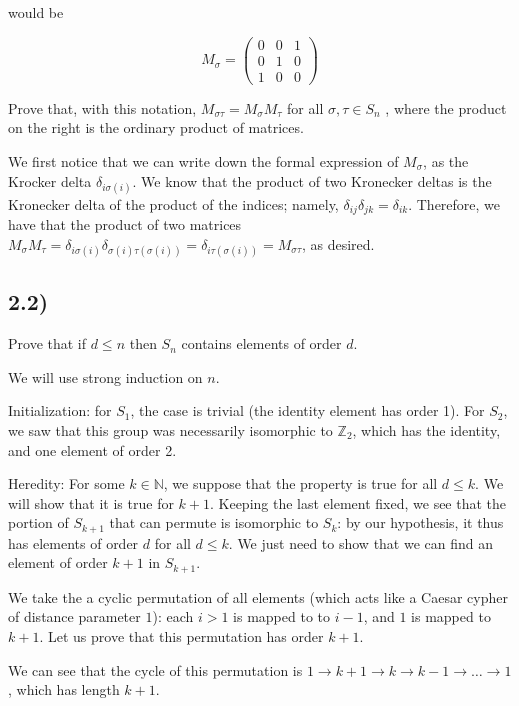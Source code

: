\documentclass[12pt, letterpaper, twoside]{report}
\begin{document}
would be

\begin{equation}
M_\sigma =
	\begin{pmatrix}
		0 & 0 & 1 \\
		0 & 1 & 0 \\
		1 & 0 & 0
	\end{pmatrix}
\end{equation}

Prove that, with this notation, $M_{\sigma\tau} = M_\sigma M_\tau$ for all $\sigma, \tau \in S_n$ , where the product on the right is the ordinary product of matrices.

We first notice that we can write down the formal expression of $M_\sigma$, as the Krocker delta $\delta_{i \sigma(i)}$. We know that the product of two Kronecker deltas is the Kronecker delta of the product of the indices; namely, $\delta_{ij} \delta_{jk} = \delta_{ik}$. Therefore, we have that the product of two matrices $M_\sigma M_\tau = \delta_{i \sigma(i)} \delta_{\sigma(i) \tau(\sigma(i))} = \delta_{i \tau(\sigma(i))} = M_{\sigma\tau}$, as desired.


\subsection*{2.2)}

Prove that if $d \leq n$ then $S_n$ contains elements of order $d$.

We will use strong induction on $n$.

Initialization: for $S_1$, the case is trivial (the identity element has order 1). For $S_2$, we saw that this group was necessarily isomorphic to $\mathbb{Z}_2$, which has the identity, and one element of order 2.

Heredity: For some $k \in \mathbb{N}$, we suppose that the property is true for all $d \leq k$. We will show that it is true for $k+1$. Keeping the last element fixed, we see that the portion of $S_{k+1}$ that can permute is isomorphic to $S_k$: by our hypothesis, it thus has elements of order $d$ for all $d \leq k$. We just need to show that we can find an element of order $k+1$ in $S_{k+1}$.

We take the a cyclic permutation of all elements (which acts like a Caesar cypher of distance parameter $1$): each $i > 1$ is mapped to to $i-1$, and $1$ is mapped to $k+1$. Let us prove that this permutation has order $k+1$.

We can see that the cycle of this permutation is $1 \rightarrow k+1 \rightarrow k \rightarrow k-1 \rightarrow \ldots \rightarrow 1$, which has length $k+1$.
\end{document}
